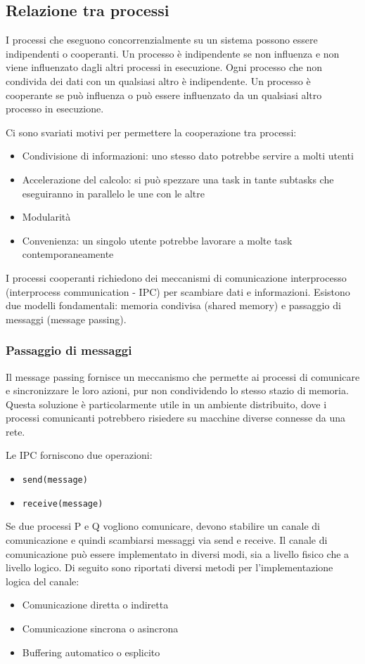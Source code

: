 \documentclass[a4paper]{article}
\begin{document}
\subsection{Relazione tra processi}
I processi che eseguono concorrenzialmente su un sistema possono essere indipendenti o cooperanti. Un processo è indipendente se non influenza e non viene influenzato dagli altri processi in esecuzione. Ogni processo che non condivida dei dati con un qualsiasi altro è indipendente. Un processo è cooperante se può influenza o può essere influenzato da un qualsiasi altro processo in esecuzione.

Ci sono svariati motivi per permettere la cooperazione tra processi:
\begin{itemize}
    \item Condivisione di informazioni: uno stesso dato potrebbe servire a molti utenti
    \item Accelerazione del calcolo: si può spezzare una task in tante subtasks che eseguiranno in parallelo le une con le altre
    \item Modularità
    \item Convenienza: un singolo utente potrebbe lavorare a molte task contemporaneamente
\end{itemize}

I processi cooperanti richiedono dei meccanismi di comunicazione interprocesso (interprocess communication - IPC) per scambiare dati e informazioni. Esistono due modelli fondamentali: memoria condivisa (shared memory) e passaggio di messaggi (message passing).

\subsubsection{Passaggio di messaggi}
Il message passing fornisce un meccanismo che permette ai processi di comunicare e sincronizzare le loro azioni, pur non condividendo lo stesso stazio di memoria. Questa soluzione è particolarmente utile in un ambiente distribuito, dove i processi comunicanti potrebbero risiedere su macchine diverse connesse da una rete.

Le IPC forniscono due operazioni:
\begin{itemize}
    \item \texttt{send(message)}
    \item \texttt{receive(message)}
\end{itemize}
Se due processi P e Q vogliono comunicare, devono stabilire un canale di comunicazione e quindi scambiarsi messaggi via send e receive. Il canale di comunicazione può essere implementato in diversi modi, sia a livello fisico che a livello logico. Di seguito sono riportati diversi metodi per l'implementazione logica del canale:
\begin{itemize}
    \item Comunicazione diretta o indiretta
    \item Comunicazione sincrona o asincrona
    \item Buffering automatico o esplicito
\end{itemize}
\end{document}
